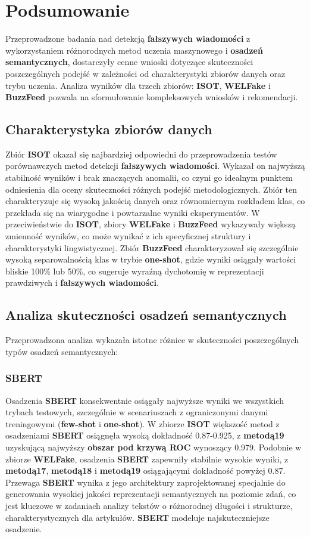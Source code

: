 \chapter{Podsumowanie}
Przeprowadzone badania nad detekcją \textbf{fałszywych wiadomości} z wykorzystaniem różnorodnych metod uczenia maszynowego i \textbf{osadzeń semantycznych}, dostarczyły cenne wnioski dotyczące skuteczności poszczególnych podejść w zależności od charakterystyki zbiorów danych oraz trybu uczenia. Analiza wyników dla trzech zbiorów: \textbf{ISOT}, \textbf{WELFake} i \textbf{BuzzFeed} pozwala na sformułowanie kompleksowych wniosków i rekomendacji.

\section{Charakterystyka zbiorów danych}
Zbiór \textbf{ISOT} okazał się najbardziej odpowiedni do przeprowadzenia testów porównawczych metod detekcji \textbf{fałszywych wiadomości}. Wykazał on najwyższą stabilność wyników i brak znaczących anomalii, co czyni go idealnym punktem odniesienia dla oceny skuteczności różnych podejść metodologicznych. Zbiór ten charakteryzuje się wysoką jakością danych oraz równomiernym rozkładem klas, co przekłada się na wiarygodne i powtarzalne wyniki eksperymentów. W przeciwieństwie do \textbf{ISOT}, zbiory \textbf{WELFake} i \textbf{BuzzFeed} wykazywały większą zmienność wyników, co może wynikać z ich specyficznej struktury i charakterystyki lingwistycznej. Zbiór \textbf{BuzzFeed} charakteryzował się szczególnie wysoką separowalnością klas w trybie \textbf{one-shot}, gdzie wyniki osiągały wartości bliskie 100\% lub 50\%, co sugeruje wyraźną dychotomię w reprezentacji prawdziwych i \textbf{fałszywych wiadomości}.

\section{Analiza skuteczności osadzeń semantycznych}
Przeprowadzona analiza wykazała istotne różnice w skuteczności poszczególnych typów osadzeń semantycznych:

\subsection{SBERT}
Osadzenia \textbf{SBERT} konsekwentnie osiągały najwyższe wyniki we wszystkich trybach testowych, szczególnie w scenariuszach z ograniczonymi danymi treningowymi (\textbf{few-shot} i \textbf{one-shot}). W zbiorze \textbf{ISOT} większość metod z osadzeniami \textbf{SBERT} osiągnęła wysoką dokładność 0.87-0.925, z \textbf{metodą19} uzyskującą najwyższy \textbf{obszar pod krzywą ROC} wynoszący 0.979. Podobnie w zbiorze \textbf{WELFake}, osadzenia \textbf{SBERT} zapewniły stabilnie wysokie wyniki, z \textbf{metodą17}, \textbf{metodą18} i \textbf{metodą19} osiągającymi dokładność powyżej 0.87. Przewaga \textbf{SBERT} wynika z jego architektury zaprojektowanej specjalnie do generowania wysokiej jakości reprezentacji semantycznych na poziomie zdań, co jest kluczowe w zadaniach analizy tekstów o różnorodnej długości i strukturze, charakterystycznych dla artykułów. \textbf{SBERT} modeluje najskuteczniejsze osadzenie.

